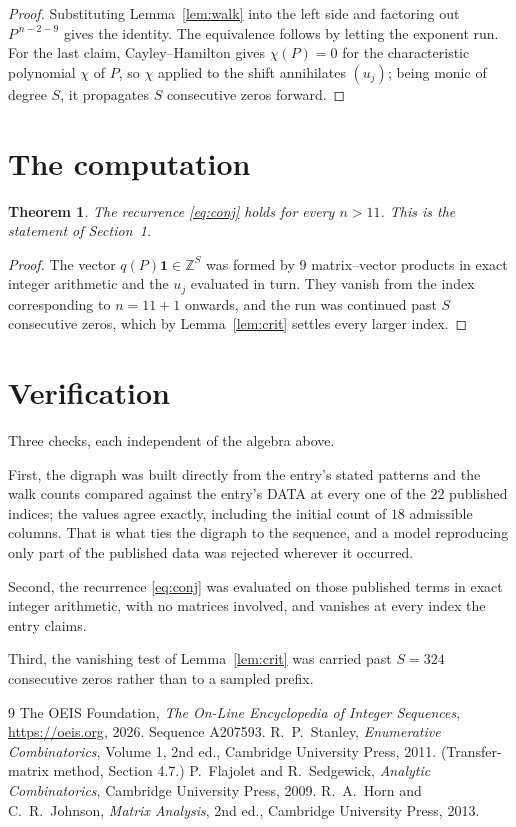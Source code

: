 \documentclass[11pt,a4paper]{article}
\theoremstyle{plain}
\newtheorem{theorem}{Theorem}
\theoremstyle{definition}
\begin{document}
\begin{proof}
Substituting Lemma~\ref{lem:walk} into the left side and factoring out
$P^{\,n-2-9}$ gives the identity. The equivalence follows by letting the exponent
run. For the last claim, Cayley--Hamilton gives $\chi(P)=0$ for the characteristic
polynomial $\chi$ of $P$, so $\chi$ applied to the shift annihilates $(u_j)$; being monic of
degree $S$, it propagates $S$ consecutive zeros forward.
\end{proof}

\section{The computation}

\begin{theorem}
The recurrence \eqref{eq:conj} holds for every $n>11$. This is the statement of
Section~1.
\end{theorem}

\begin{proof}
The vector $q(P)\mathbf{1}\in\mathbb{Z}^{S}$ was formed by $9$ matrix--vector
products in exact integer arithmetic and the $u_j$ evaluated in turn. They vanish from the
index corresponding to $n=11+1$ onwards, and the run was continued past $S$ consecutive
zeros, which by Lemma~\ref{lem:crit} settles every larger index.
\end{proof}

\section{Verification}

Three checks, each independent of the algebra above.

First, the digraph was built directly from the entry's stated patterns and the walk counts
compared against the entry's DATA at every one of the $22$ published indices; the
values agree exactly, including the initial count of $18$ admissible columns. That is
what ties the digraph to the sequence, and a model reproducing only part of the published
data was rejected wherever it occurred.

Second, the recurrence \eqref{eq:conj} was evaluated on those published terms in exact
integer arithmetic, with no matrices involved, and vanishes at every index the entry claims.

Third, the vanishing test of Lemma~\ref{lem:crit} was carried past $S=324$ consecutive
zeros rather than to a sampled prefix.

\begin{thebibliography}{9}
 The OEIS Foundation, \emph{The On-Line Encyclopedia of Integer
Sequences}, \url{https://oeis.org}, 2026. Sequence A207593.
 R.~P.~Stanley, \emph{Enumerative Combinatorics}, Volume 1, 2nd ed.,
Cambridge University Press, 2011. (Transfer-matrix method, Section 4.7.)
 P.~Flajolet and R.~Sedgewick, \emph{Analytic Combinatorics}, Cambridge
University Press, 2009.
 R.~A.~Horn and C.~R.~Johnson, \emph{Matrix Analysis}, 2nd ed., Cambridge
University Press, 2013.
\end{thebibliography}
\end{document}
